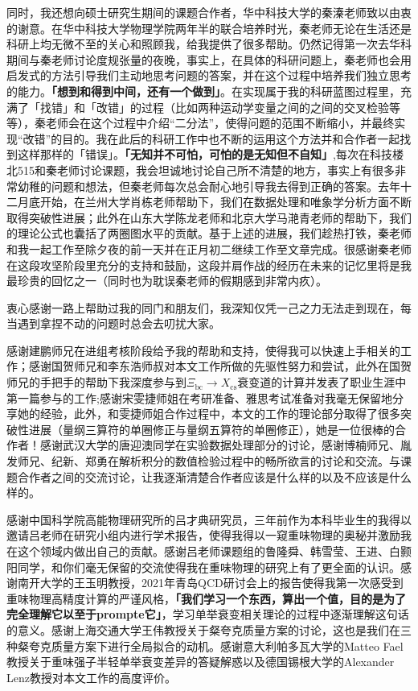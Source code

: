 \documentclass{LZUThesis-PgD&PhD}
\newcommand{\tb}[1]{\textbf{#1}}
\newcommand{\mrm}[1]{\mathrm{#1}}
\begin{document}
同时，我还想向硕士研究生期间的课题合作者，华中科技大学的秦溱老师致以由衷的谢意。在华中科技大学物理学院两年半的联合培养时光，秦老师无论在生活还是科研上均无微不至的关心和照顾我，给我提供了很多帮助。仍然记得第一次去华科期间与秦老师讨论度规张量的夜晚，事实上，在具体的科研问题上，秦老师也会用启发式的方法引导我们主动地思考问题的答案，并在这个过程中培养我们独立思考的能力。\textbf{「想到和得到中间，还有一个做到」}。在实现属于我的科研蓝图过程里，充满了「找错」和「改错」的过程（比如两种运动学变量之间的之间的交叉检验等等），秦老师会在这个过程中介绍“二分法”，使得问题的范围不断缩小，并最终实现“改错”的目的。我在此后的科研工作中也不断的运用这个方法并和合作者一起找到这样那样的「错误」。\textbf{「无知并不可怕，可怕的是无知但不自知」},每次在科技楼北515和秦老师讨论课题，我会坦诚地讨论自己所不清楚的地方，事实上有很多非常幼稚的问题和想法，但秦老师每次总会耐心地引导我去得到正确的答案。去年十二月底开始，在兰州大学肖栋老师帮助下，我们在数据处理和唯象学分析方面不断取得突破性进展；此外在山东大学陈龙老师和北京大学马滟青老师的帮助下，我们的理论公式也囊括了两圈图水平的贡献。基于上述的进展，我们趁热打铁，秦老师和我一起工作至除夕夜的前一天并在正月初二继续工作至文章完成。很感谢秦老师在这段攻坚阶段里充分的支持和鼓励，这段并肩作战的经历在未来的记忆里将是我最珍贵的回忆之一（同时也为耽误秦老师的假期感到非常内疚）。


衷心感谢一路上帮助过我的同门和朋友们，我深知仅凭一己之力无法走到现在，每当遇到拿捏不动的问题时总会去叨扰大家。

感谢建鹏师兄在进组考核阶段给予我的帮助和支持，使得我可以快速上手相关的工作；感谢国贺师兄和李东浩师叔对本文工作所做的先驱性努力和尝试，此外在国贺师兄的手把手的帮助下我深度参与到$\Xi_{\mrm{bc}}\to X_{\mrm{cs}}$衰变道的计算并发表了职业生涯中第一篇参与的工作;感谢宋雯捷师姐在考研准备、雅思考试准备对我毫无保留地分享她的经验，此外，和雯捷师姐合作过程中，本文的工作的理论部分取得了很多突破性进展（量纲三算符的单圈修正与量纲五算符的单圈修正），她是一位很棒的合作者！感谢武汉大学的唐迎澳同学在实验数据处理部分的讨论，感谢博楠师兄、胤发师兄、纪新、郑勇在解析积分的数值检验过程中的畅所欲言的讨论和交流。与课题合作者之间的交流讨论，让我逐渐清楚合作者应该是什么样的以及不应该是什么样的。

感谢中国科学院高能物理研究所的吕才典研究员，三年前作为本科毕业生的我得以邀请吕老师在研究小组内进行学术报告，使得我得以一窥重味物理的奥秘并激励我在这个领域内做出自己的贡献。感谢吕老师课题组的鲁隆舜、韩雪莹、王进、白颢阳同学，和你们毫无保留的交流使得我在重味物理的研究上有了更全面的认识。感谢南开大学的王玉明教授，2021年青岛QCD研讨会上的报告使得我第一次感受到重味物理高精度计算的严谨风格，\tb{「我们学习一个东西，算出一个值，目的是为了完全理解它以至于prompte它」}，学习单举衰变相关理论的过程中逐渐理解这句话的意义。感谢上海交通大学王伟教授关于粲夸克质量方案的讨论，这也是我们在三种粲夸克质量方案下进行全局拟合的动机。感谢意大利帕多瓦大学的Matteo Fael教授关于重味强子半轻单举衰变差异的答疑解惑以及德国锡根大学的Alexander Lenz教授对本文工作的高度评价。
\end{document}
